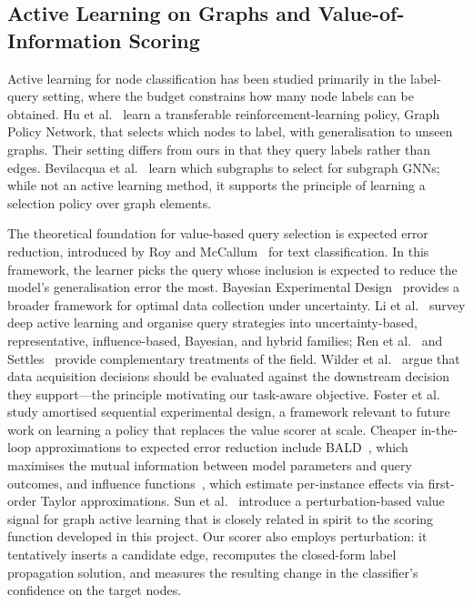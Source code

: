 \documentclass[11pt,a4paper]{article}
\newif\ifshowverify
\newcommand{\verify}{\ifshowverify\textcolor{red}{\textsuperscript{[verify]}}\fi}
\begin{document}
\subsection{Active Learning on Graphs and Value-of-Information Scoring}

Active learning for node classification has been studied primarily in the label-query setting,
where the budget constrains how many node labels can be obtained. Hu et al.~\cite{gpa} learn a
transferable reinforcement-learning policy, Graph Policy Network, that selects which nodes to
label, with generalisation to unseen graphs\verify. Their setting differs from ours in that
they query labels rather than edges. Bevilacqua et al.~\cite{subgnn} learn which subgraphs to
select for subgraph GNNs; while not an active learning method, it supports the principle of
learning a selection policy over graph elements\verify.

The theoretical foundation for value-based query selection is expected error reduction, introduced
by Roy and McCallum~\cite{roy} for text classification. In this framework, the learner picks the
query whose inclusion is expected to reduce the model's generalisation error the most. Bayesian
Experimental Design~\cite{bed} provides a broader framework for optimal data collection under
uncertainty. Li et al.~\cite{li} survey deep active learning and organise query strategies into
uncertainty-based, representative, influence-based, Bayesian, and hybrid families\verify;
Ren et al.~\cite{ren} and Settles~\cite{settles} provide complementary treatments of the field.
Wilder et al.~\cite{wilder} argue that data acquisition decisions should be evaluated against the
downstream decision they support---the principle motivating our task-aware objective. Foster et
al.~\cite{foster} study amortised sequential experimental design, a framework relevant to future
work on learning a policy that replaces the value scorer at scale. Cheaper in-the-loop
approximations to expected error reduction include BALD~\cite{bald,gal}, which maximises the mutual
information between model parameters and query outcomes, and influence functions~\cite{koh},
which estimate per-instance effects via first-order Taylor approximations. Sun et al.~\cite{perbal} introduce a perturbation-based value signal for graph
active learning that is closely related in spirit to the scoring function developed in this
project\verify. Our scorer also employs perturbation: it tentatively inserts a candidate edge,
recomputes the closed-form label propagation solution, and measures the resulting change in the
classifier's confidence on the target nodes.
\end{document}
